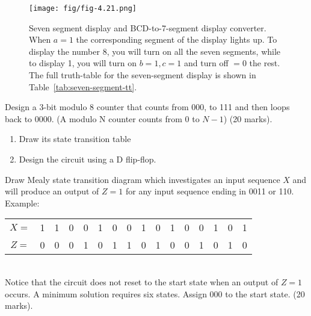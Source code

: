 \begin{figure}[h!]
  \texttt{[image: fig/fig-4.21.png]}
  \\
  \caption{Seven segment display and BCD-to-7-segment display converter. When
    $a=1$ the corresponding segment of the display lights up. To display the
    number 8, you will turn on all the seven segments, while to display 1, you
    will turn on $b=1, c=1$ and turn off $=0$ the rest. The full truth-table for
  the seven-segment display is shown in Table~\ref{tab:seven-segment-tt}.}
  \label{fig:seven-seg-display}
\end{figure}


\begin{prob}
  Design a 3-bit modulo 8 counter that counts from 000, to 111 and then loops back
  to 0000. (A modulo N counter counts from 0 to $N-1$) (20 marks).\\
  \begin{enumerate}
  \item Draw its state transition table
  \item Design the circuit using a D flip-flop.
  \end{enumerate}
\end{prob}


\begin{prob}
Draw Mealy state transition diagram which investigates an input sequence
$X$ and will produce an output of $Z=1$ for any input sequence ending in 0011 or 110.\\
Example:\\
\begin{tabular}{c c c c c c c c c c c c c c c c}
$X=$&1&1&0&0&1&0&0&1&0&1&0&0&1&0&1\\
$Z=$&0&0&0&1&0&1&1&0&1&0&0&1&0&1&0
\end{tabular}\\
Notice that the circuit does not reset to the start state when an output of $Z = 1$
occurs. A minimum solution requires six states. Assign 000 to the start state. (20 marks).
\end{prob}

